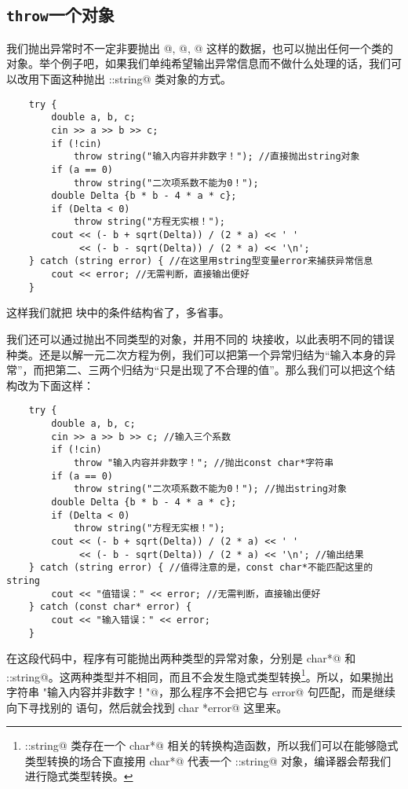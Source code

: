 \subsection*{\texttt{throw}一个对象}
我们抛出异常时不一定非要抛出 @, @, @ 这样的数据，也可以抛出任何一个类的对象。举个例子吧，如果我们单纯希望输出异常信息而不做什么处理的话，我们可以改用下面这种抛出 \lstinline@std::string@ 类对象的方式。
\begin{lstlisting}
    try {
        double a, b, c;
        cin >> a >> b >> c;
        if (!cin)
            throw string("输入内容并非数字！"); //直接抛出string对象
        if (a == 0)
            throw string("二次项系数不能为0！");
        double Delta {b * b - 4 * a * c};
        if (Delta < 0)
            throw string("方程无实根！");
        cout << (- b + sqrt(Delta)) / (2 * a) << ' '
             << (- b - sqrt(Delta)) / (2 * a) << '\n';
    } catch (string error) { //在这里用string型变量error来捕获异常信息
        cout << error; //无需判断，直接输出便好
    }
\end{lstlisting}\par
这样我们就把 \lstinline@catch@ 块中的条件结构省了，多省事。\par
我们还可以通过抛出不同类型的对象，并用不同的 \lstinline@catch@ 块接收，以此表明不同的错误种类。还是以解一元二次方程为例，我们可以把第一个异常归结为``输入本身的异常''，而把第二、三两个归结为``只是出现了不合理的值''。那么我们可以把这个结构改为下面这样：
\begin{lstlisting}
    try {
        double a, b, c;
        cin >> a >> b >> c; //输入三个系数
        if (!cin)
            throw "输入内容并非数字！"; //抛出const char*字符串
        if (a == 0)
            throw string("二次项系数不能为0！"); //抛出string对象
        double Delta {b * b - 4 * a * c};
        if (Delta < 0)
            throw string("方程无实根！");
        cout << (- b + sqrt(Delta)) / (2 * a) << ' '
             << (- b - sqrt(Delta)) / (2 * a) << '\n'; //输出结果
    } catch (string error) { //值得注意的是，const char*不能匹配这里的string
        cout << "值错误：" << error; //无需判断，直接输出便好
    } catch (const char* error) {
        cout << "输入错误：" << error;
    }
\end{lstlisting}\par
在这段代码中，程序有可能抛出两种类型的异常对象，分别是 \lstinline@const char*@ 和 \lstinline@std::string@。这两种类型并不相同，而且不会发生隐式类型转换\footnote{\lstinline@std::string@ 类存在一个 \lstinline@const char*@ 相关的转换构造函数，所以我们可以在能够隐式类型转换的场合下直接用 \lstinline@const char*@ 代表一个 \lstinline@std::string@ 对象，编译器会帮我们进行隐式类型转换。}。所以，如果抛出字符串 \lstinline@"输入内容并非数字！"@，那么程序不会把它与 \lstinline@string error@ 句匹配，而是继续向下寻找别的 \lstinline@catch@ 语句，然后就会找到 \lstinline@const char *error@ 这里来。\par
